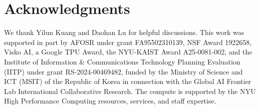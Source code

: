 \section*{Acknowledgments}
We thank Yilun Kuang and Daohan Lu for helpful discussions. This work was supported in part by AFOSR under grant FA95502310139, NSF Award 1922658, Visko AI, a Google TPU Award, the NYU-KAIST Award A25-0081-002, and the Institute of Information \& Communications Technology Planning Evaluation (IITP) under grant RS-2024-00469482, funded by the Ministry of Science and ICT (MSIT) of the Republic of Korea in connection with the Global AI Frontier Lab International Collaborative Research.
The compute is supported by the NYU High Performance Computing resources, services, and staff expertise.
